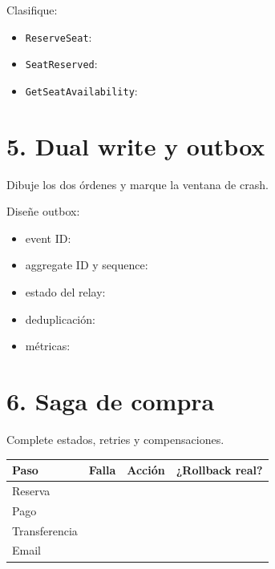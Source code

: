 \documentclass[variant=guia,cover=institutional,mode=print]{ua-engineering-v6-article}
\begin{document}
Clasifique:
\begin{itemize}
\item \texttt{ReserveSeat}: \hrulefill
\item \texttt{SeatReserved}: \hrulefill
\item \texttt{GetSeatAvailability}: \hrulefill
\end{itemize}

\newpage
\section{5. Dual write y outbox}
Dibuje los dos órdenes y marque la ventana de crash.
\vspace{4cm}

Diseñe outbox:
\begin{itemize}
\item event ID: \hrulefill
\item aggregate ID y sequence: \hrulefill
\item estado del relay: \hrulefill
\item deduplicación: \hrulefill
\item métricas: \hrulefill
\end{itemize}

\newpage
\section{6. Saga de compra}
Complete estados, retries y compensaciones.

\begin{center}
\end{center}

\begin{tabular}{p{}p{}p{}p{}}
\toprule
Paso & Falla & Acción & ¿Rollback real? \\
\midrule
Reserva & \rule{0pt}{1cm} & & \\
Pago & \rule{0pt}{1cm} & & \\
Transferencia & \rule{0pt}{1cm} & & \\
Email & \rule{0pt}{1cm} & & \\
\bottomrule
\end{tabular}
\end{document}
